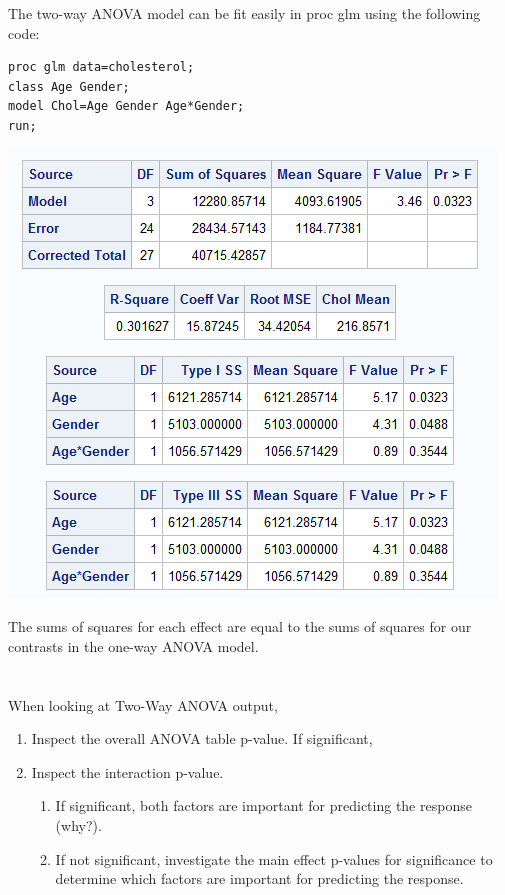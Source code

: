 \newpage

The two-way ANOVA model can be fit easily in proc glm using the following code:
\begin{small}
\begin{verbatim}
proc glm data=cholesterol;
class Age Gender;
model Chol=Age Gender Age*Gender; 
run;
\end{verbatim}
\end{small}

\begin{center}
\includegraphics[scale=0.75]{CholTwoWay}
\end{center}

The sums of squares for each effect are equal to the sums of squares for our contrasts in the one-way ANOVA model.\\~\\~\\
When looking at Two-Way ANOVA output,
\begin{enumerate}
\item Inspect the overall ANOVA table p-value.  If significant,
\item Inspect the interaction p-value.  
\begin{enumerate}
\item If significant, both factors are important for predicting the response (why?).
\item If not significant, investigate the main effect p-values for significance to determine which factors are important for predicting the response.
\end{enumerate}
\end{enumerate}

